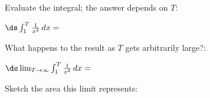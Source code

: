 Evaluate the integral; the answer depends on $T$:

\medskip
\noindent $\ds \int_1^T \frac{1}{x^2}\,dx = $

\vspace{30mm}

\noindent What happens to the result as $T$ gets arbitrarily large?:

\medskip
\noindent $\ds \lim_{T\to\infty} \int_1^T \frac{1}{x^2}\,dx = $

\vspace{30mm}

\noindent Sketch the area this limit represents:
